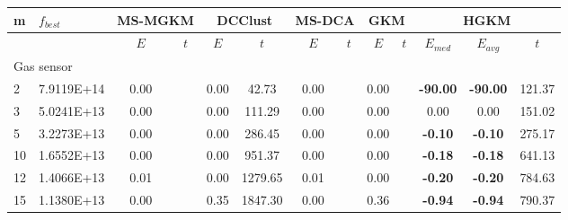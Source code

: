 {\footnotesize
\centering
\begin{longtable}{@{}llccccccccccc@{}}
\hline
\multicolumn{1}{l|}{m}  & \multicolumn{1}{l|}{$f_{best}$} & \multicolumn{2}{c|}{MS-MGKM}    & \multicolumn{2}{c|}{DCClust}         & \multicolumn{2}{c|}{MS-DCA}     & \multicolumn{2}{c|}{GKM}        & \multicolumn{3}{c}{HGKM}                    \\ \hline
                        & \multicolumn{1}{l|}{}           & $E$  & \multicolumn{1}{c|}{$t$} & $E$  & \multicolumn{1}{c|}{$t$}      & $E$  & \multicolumn{1}{c|}{$t$} & $E$  & \multicolumn{1}{c|}{$t$} & $E_{med}$       & $E_{avg}$       & $t$     \\ \hline
\multicolumn{13}{l}{Gas sensor}                                                                                                                                                                                                                      \\ \hline
\multicolumn{1}{l|}{2}  & \multicolumn{1}{l|}{7.9119E+14} & 0.00 & \multicolumn{1}{c|}{}    & 0.00 & \multicolumn{1}{c|}{42.73}    & 0.00 & \multicolumn{1}{c|}{}    & 0.00 & \multicolumn{1}{c|}{}    & \textbf{-90.00} & \textbf{-90.00} & 121.37  \\
\multicolumn{1}{l|}{3}  & \multicolumn{1}{l|}{5.0241E+13} & 0.00 & \multicolumn{1}{c|}{}    & 0.00 & \multicolumn{1}{c|}{111.29}   & 0.00 & \multicolumn{1}{c|}{}    & 0.00 & \multicolumn{1}{c|}{}    & 0.00            & 0.00            & 151.02  \\
\multicolumn{1}{l|}{5}  & \multicolumn{1}{l|}{3.2273E+13} & 0.00 & \multicolumn{1}{c|}{}    & 0.00 & \multicolumn{1}{c|}{286.45}   & 0.00 & \multicolumn{1}{c|}{}    & 0.00 & \multicolumn{1}{c|}{}    & \textbf{-0.10}  & \textbf{-0.10}  & 275.17  \\
\multicolumn{1}{l|}{10} & \multicolumn{1}{l|}{1.6552E+13} & 0.00 & \multicolumn{1}{c|}{}    & 0.00 & \multicolumn{1}{c|}{951.37}   & 0.00 & \multicolumn{1}{c|}{}    & 0.00 & \multicolumn{1}{c|}{}    & \textbf{-0.18}  & \textbf{-0.18}  & 641.13  \\
\multicolumn{1}{l|}{12} & \multicolumn{1}{l|}{1.4066E+13} & 0.01 & \multicolumn{1}{c|}{}    & 0.00 & \multicolumn{1}{c|}{1279.65}  & 0.01 & \multicolumn{1}{c|}{}    & 0.00 & \multicolumn{1}{c|}{}    & \textbf{-0.20}  & \textbf{-0.20}  & 784.63  \\
\multicolumn{1}{l|}{15} & \multicolumn{1}{l|}{1.1380E+13} & 0.00 & \multicolumn{1}{c|}{}    & 0.35 & \multicolumn{1}{c|}{1847.30}  & 0.00 & \multicolumn{1}{c|}{}    & 0.36 & \multicolumn{1}{c|}{}    & \textbf{-0.94}  & \textbf{-0.94}  & 790.37  \\

\end{longtable}}
